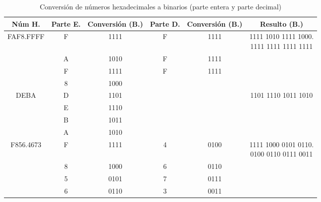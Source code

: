\documentclass[12pt]{article}
\begin{document}
\begin{table}[H]
	\centering
	\renewcommand{\arraystretch}{1.3}
	\begin{tabular}{|c|c|c|c|c|c|}
		\hline
		\textbf{Núm H.} & \textbf{Parte E.} & \textbf{Conversión (B.)} & \textbf{Parte D.} & \textbf{Conversión (B.)} & \textbf{Resulto (B.)} \\
		\hline
		FAF8.FFFF & F & 1111 & F & 1111 & \makecell[l]{1111 1010 1111 1000.\\1111 1111 1111 1111} \\
		\hline
		& A & 1010 & F & 1111 & \\
		\hline
		& F & 1111 & F & 1111 & \\
		\hline
		& 8 & 1000 &  &  & \\
		\hline
		DEBA & D & 1101 &  &  & 1101 1110 1011 1010 \\
		\hline
		& E & 1110 &  &  & \\
		\hline
		& B & 1011 &  &  & \\
		\hline
		& A & 1010 &  &  & \\
		\hline
		F856.4673 & F & 1111 & 4 & 0100 & \makecell[l]{1111 1000 0101 0110.\\0100 0110 0111 0011} \\
		\hline
		& 8 & 1000 & 6 & 0110 & \\
		\hline
		& 5 & 0101 & 7 & 0111 & \\
		\hline
		& 6 & 0110 & 3 & 0011 & \\
		\hline
	\end{tabular}
	\caption{Conversión de números hexadecimales a binarios (parte entera y parte decimal)}
\end{table}
\end{document}
